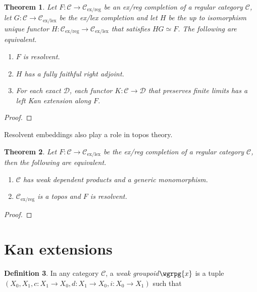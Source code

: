\documentclass[sort&compress]{elsarticle}
\theoremstyle{plain}
\newtheorem{theorem}{Theorem}
\theoremstyle{definition}
\newtheorem{definition}[theorem]{Definition}
\theoremstyle{remark}
\newcommand\hide[1]{}
\newcommand\key[1]{\emph{#1}\label{#1}}
\newcommand\cat\mathcal
\newcommand\exlex{_\mathrm{ex/lex}}\newcommand\exreg{_\mathrm{ex/reg}}
\newcommand\of:
\begin{document}
\begin{theorem} Let $F:\cat C\to\cat C\exreg$ be an ex/reg completion of a regular category $\cat C$, let $G\of \cat C \to \cat C\exlex$ be the ex/lex completion and let $H$ be the up to isomorphism unique functor $H\of\cat C\exreg \to \cat C\exlex$ that satisfies $HG\simeq F$. 
The following are equivalent.
\begin{enumerate}
\item $F$ is resolvent.
\item $H$ has a fully faithful right adjoint.
\item For each exact $\cat D$, each functor $K\of \cat C \to \cat D$ that preserves finite limits has a left Kan extension along $F$.
\end{enumerate}
\end{theorem}

\begin{proof}
\hide{Point ahead to lemmas down this paper

ThA -> LKE,converse,adjunct
adjunct -> LKE


ThB -> lccc, closubclass, ...


}
\end{proof}

Resolvent embeddings also play a role in topos theory.

\begin{theorem} Let $F:\cat C\to\cat C\exlex$ be the ex/reg completion of a regular category $\cat C$, then the following are equivalent.
\begin{enumerate}
\item $\cat C$ has \emph{weak dependent products} and a \emph{generic monomorphism}. \hide{these need to be defined somewhere}
\item $\cat C\exreg$ is a topos and $F$ is resolvent. 
\end{enumerate}
\end{theorem}

\begin{proof}
\hide{Point ahead to lemmas down this paper}
\end{proof}

\hide{conclusion... }

\section{Kan extensions}

\begin{definition} In any category $\cat C$, a \key{weak groupoid} $\wgrpg{x}$ is a tuple $(X_0,X_1,c:X_1\to X_0,d:X_1\to X_0,i:X_0\to X_1)$ such that


\end{definition}
\end{document}
